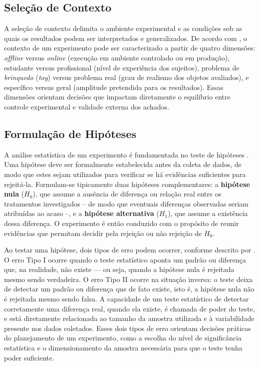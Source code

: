 \subsection{Seleção de Contexto}
\label{sec:selecao_de_contexto_ref}

A seleção de contexto delimita o ambiente experimental e as condições sob as quais os resultados podem ser interpretados e generalizados. De acordo com , o contexto de um experimento pode ser caracterizado a partir de quatro dimensões: \textit{offline} versus \textit{online} (execução em ambiente controlado ou em produção), estudante versus profissional (nível de experiência dos sujeitos), problema de \textit{brinquedo} (\textit{toy}) versus problema real (grau de realismo dos objetos avaliados), e específico versus geral (amplitude pretendida para os resultados). Essas dimensões orientam decisões que impactam diretamente o equilíbrio entre controle experimental e validade externa dos achados.

\subsection{Formulação de Hipóteses}
\label{sec:formulacao_hipoteses_ref}

A análise estatística de um experimento é fundamentada no teste de hipóteses . Uma hipótese deve ser formalmente estabelecida antes da coleta de dados, de modo que estes sejam utilizados para verificar se há evidências suficientes para rejeitá-la. Formulam-se tipicamente duas hipóteses complementares: a \textbf{hipótese nula} ($H_0$), que assume a ausência de diferença ou relação real entre os tratamentos investigados -- de modo que eventuais diferenças observadas seriam atribuídas ao acaso --, e a \textbf{hipótese alternativa} ($H_1$), que assume a existência dessa diferença. O experimento é então conduzido com o propósito de reunir evidências que permitam decidir pela rejeição ou não rejeição de $H_0$.
 
Ao testar uma hipótese, dois tipos de erro podem ocorrer, conforme descrito por . O erro Tipo I ocorre quando o teste estatístico aponta um padrão ou diferença que, na realidade, não existe --- ou seja, quando a hipótese nula é rejeitada mesmo sendo verdadeira. O erro Tipo II ocorre na situação inversa: o teste deixa de detectar um padrão ou diferença que de fato existe, isto é, a hipótese nula não é rejeitada mesmo sendo falsa. A capacidade de um teste estatístico de detectar corretamente uma diferença real, quando ela existe, é chamada de poder do teste, e está diretamente relacionada ao tamanho da amostra utilizada e à variabilidade presente nos dados coletados. Esses dois tipos de erro orientam decisões práticas do planejamento de um experimento, como a escolha do nível de significância estatística e o dimensionamento da amostra necessária para que o teste tenha poder suficiente.


